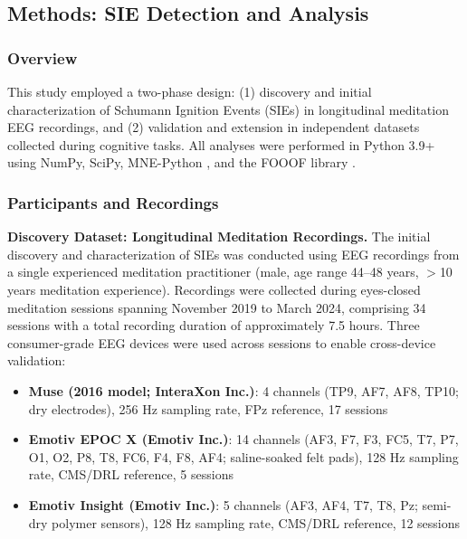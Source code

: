 \documentclass[11pt,a4paper]{article}
\begin{document}

\subsection{Methods: SIE Detection and Analysis}

\subsubsection{Overview}
This study employed a two-phase design: (1) discovery and initial characterization of Schumann Ignition Events (SIEs) in longitudinal meditation EEG recordings, and (2) validation and extension in independent datasets collected during cognitive tasks. All analyses were performed in Python 3.9+ using NumPy, SciPy, MNE-Python \parencite{harris2020numpy, virtanen2020scipy, gramfort2013mne}, and the FOOOF library \parencite{donoghue2020fooof}.

\subsubsection{Participants and Recordings}

\textbf{Discovery Dataset: Longitudinal Meditation Recordings.}
The initial discovery and characterization of SIEs was conducted using EEG recordings from a single experienced meditation practitioner (male, age range 44--48 years, $>$10 years meditation experience). Recordings were collected during eyes-closed meditation sessions spanning November 2019 to March 2024, comprising 34 sessions with a total recording duration of approximately 7.5 hours. Three consumer-grade EEG devices were used across sessions to enable cross-device validation:

\begin{itemize}
    \item \textbf{Muse (2016 model; InteraXon Inc.)}: 4 channels (TP9, AF7, AF8, TP10; dry electrodes), 256 Hz sampling rate, FPz reference, 17 sessions
    \item \textbf{Emotiv EPOC X (Emotiv Inc.)}: 14 channels (AF3, F7, F3, FC5, T7, P7, O1, O2, P8, T8, FC6, F4, F8, AF4; saline-soaked felt pads), 128 Hz sampling rate, CMS/DRL reference, 5 sessions
    \item \textbf{Emotiv Insight (Emotiv Inc.)}: 5 channels (AF3, AF4, T7, T8, Pz; semi-dry polymer sensors), 128 Hz sampling rate, CMS/DRL reference, 12 sessions
\end{itemize}
\end{document}
